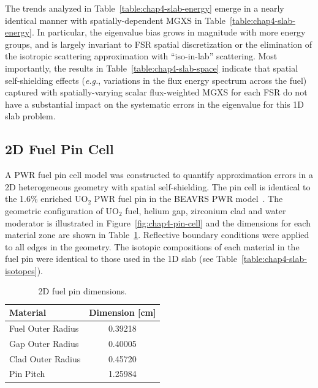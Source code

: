 The trends analyzed in Table~\ref{table:chap4-slab-energy} emerge in a nearly identical manner with spatially-dependent \ac{MGXS} in Table~\ref{table:chap4-slab-energy}. In particular, the eigenvalue bias grows in magnitude with more energy groups, and is largely invariant to \ac{FSR} spatial discretization or the elimination of the isotropic scattering approximation with ``iso-in-lab'' scattering. Most importantly, the results in Table~\ref{table:chap4-slab-space} indicate that spatial self-shielding effects (\textit{e.g.}, variations in the flux energy spectrum across the fuel) captured with spatially-varying scalar flux-weighted \ac{MGXS} for each \ac{FSR} do not have a substantial impact on the systematic errors in the eigenvalue for this 1D slab problem.


\subsection{2D Fuel Pin Cell}
\label{subsec:chap4-pin}

A \ac{PWR} fuel pin cell model was constructed to quantify approximation errors in a 2D heterogeneous geometry with spatial self-shielding. The pin cell is identical to the 1.6\% enriched UO$_2$ \ac{PWR} fuel pin in the \ac{BEAVRS} \ac{PWR} model~\cite{horelik2013beavrs}. The geometric configuration of UO$_2$ fuel, helium gap, zirconium clad and water moderator is illustrated in Figure~\ref{fig:chap4-pin-cell} and the dimensions for each material zone are shown in Table~\ref{table:chap4-pin-dimensions}. Reflective boundary conditions were applied to all edges in the geometry. The isotopic compositions of each material in the fuel pin were identical to those used in the 1D slab (see Table~\ref{table:chap4-slab-isotopes}). 

\begin{table}[H]
  \centering
  \caption[2D fuel pin dimensions]{2D fuel pin dimensions.}
  \label{table:chap4-pin-dimensions} 
  \vspace{6pt}
  \begin{tabular}{b c}
  \toprule
  \rowcolor{lightgray}
  {\bf Material} &
  {\bf Dimension [cm]} \\
  \midrule
  Fuel Outer Radius &     0.39218 \\
  Gap Outer Radius &      0.40005 \\
  Clad Outer Radius &     0.45720 \\
  Pin Pitch &             1.25984 \\
  \bottomrule
\end{tabular}
\end{table}

